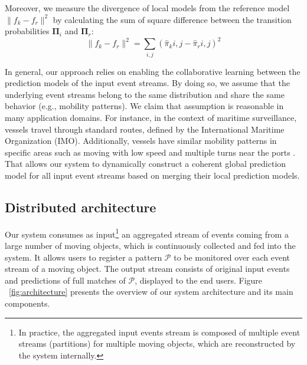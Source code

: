 \par Moreover, we measure the divergence of local models from the reference model  $\|f_k - f_r\|^2$ by calculating the sum of square difference between the transition probabilities  $\boldsymbol{\Pi}_i$ and  $\boldsymbol{\Pi}_r$:
\begin{equation*}
\label{eq:dis_pi_varinace}
\|f_k - f_r\|^2=\sum_{i,j} (\hat{\pi}_k{i,j} -\hat{\pi}_r{i,j})^2
\end{equation*}
\par In general, our approach relies on enabling the collaborative learning between the prediction models of  the input event streams. By doing so, we assume that the underlying event streams belong to the same  distribution and share the same behavior (e.g., mobility patterns). We claim that assumption is reasonable in many application domains. For instance, in the context of maritime surveillance, vessels travel through standard routes, defined by the International Maritime Organization (IMO). Additionally, vessels have similar mobility patterns in specific areas such as moving with low speed and multiple turns near the ports \cite{pallotta2013vessel,liu2014knowledge}. That allows our system to dynamically construct a coherent global prediction model for all input event streams based on merging their local prediction models.



\subsection{Distributed architecture}
\label{sec:architecture}
Our system consumes as input\footnote{In practice, the aggregated input events stream is composed of multiple event streams (partitions) for multiple moving objects, which are reconstructed by the system internally.} an aggregated stream of events coming from a large number of moving objects, which is continuously collected and fed into the system. It allows users to register a pattern $\mathcal{P}$ to be monitored over each event stream of a moving object. The output stream consists of original input events and predictions of full matches of $\mathcal{P}$, displayed to the end users. Figure ~\ref{fig:architecture} presents the overview of our system architecture and its main components.      


